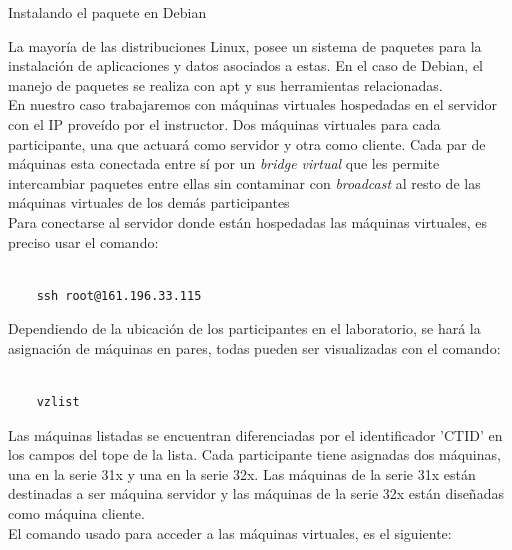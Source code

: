 \begin{frame}{Instalando el paquete en Debian}

    La mayoría de las distribuciones Linux, posee un sistema de paquetes para
    la instalación de aplicaciones y datos asociados a estas. En el caso de
    Debian, el manejo de paquetes se realiza con apt y sus herramientas
    relacionadas.\\[0.2cm]

    En nuestro caso trabajaremos con máquinas virtuales hospedadas en el
    servidor con el IP proveído por el instructor. Dos máquinas virtuales para
    cada participante, una que actuará como servidor y otra como
    cliente. Cada par de máquinas esta conectada entre sí por un
    \textit{bridge virtual} que les permite intercambiar paquetes entre ellas
    sin contaminar con \textit{broadcast} al resto de las máquinas virtuales de
    los demás participantes\\[0.2cm] 

    Para conectarse al servidor donde están hospedadas las máquinas virtuales,
    es preciso usar el comando:

\begin{verbatim}

    ssh root@161.196.33.115

\end{verbatim} 

    Dependiendo de la ubicación de los participantes en el
    laboratorio, se hará la asignación de máquinas en pares,
    todas pueden ser visualizadas con el comando:\\[0.2cm]

\begin{verbatim}

    vzlist

\end{verbatim} 
     
    Las máquinas listadas se encuentran diferenciadas por el identificador
    'CTID' en los campos del tope de la lista.  Cada participante tiene
    asignadas dos máquinas, una en la serie 31x y una en la serie 32x.
    Las máquinas de la serie 31x están destinadas a ser máquina servidor
    y las máquinas de la serie 32x están diseñadas como máquina cliente.\\[0.2cm]

    El comando usado para acceder a las máquinas virtuales, es el siguiente:

\begin{verbatim}


\end{verbatim}
\end{frame}
